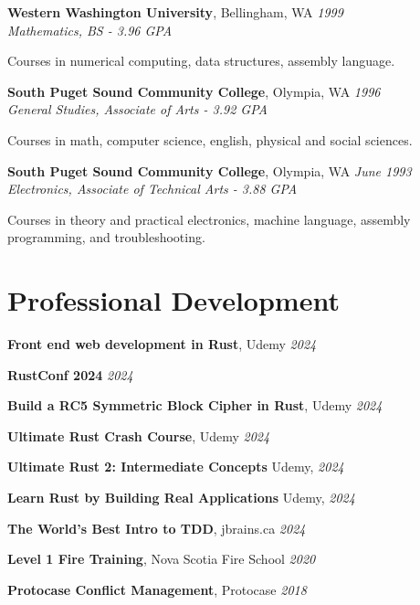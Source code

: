 \documentclass[letter,11pt]{article}
\newenvironment{noindentblock}{%
  \begin{list}{}{%
    \setlength{\leftmargin}{0in} %
    \setlength{\rightmargin}{.25in} %
    \setlength{\topsep}{0pt} %
    \setlength{\parsep}{0pt} %
  }
  \item[]}{\end{list}}
\begin{document}
\noindent
\textbf{Western Washington University}, Bellingham, WA \hfill \textit{1999}\\
\textit{Mathematics, BS - 3.96 GPA}
\begin{noindentblock}
Courses in numerical computing, data structures, assembly language.
\end{noindentblock}

\noindent
\textbf{South Puget Sound Community College}, Olympia, WA \hfill \textit{1996}\\
\textit{General Studies, Associate of Arts - 3.92 GPA}
\begin{noindentblock}
Courses in math, computer science, english, physical and social sciences.
\end{noindentblock}

\noindent
\textbf{South Puget Sound Community College}, Olympia, WA \hfill \textit{June 1993}\\
\textit{Electronics, Associate of Technical Arts - 3.88 GPA}
\begin{noindentblock}
Courses in theory and practical electronics, machine language, assembly programming, and troubleshooting.
\end{noindentblock}

\section*{Professional Development}
\noindent
\textbf{Front end web development in Rust}, Udemy \hfill \textit{2024}

\noindent
\textbf{RustConf 2024} \hfill \textit{2024}

\noindent
\textbf{Build a RC5 Symmetric Block Cipher in Rust}, Udemy \hfill \textit{2024}

\noindent
\textbf{Ultimate Rust Crash Course}, Udemy \hfill \textit{2024}

\noindent
\textbf{Ultimate Rust 2: Intermediate Concepts} Udemy, \hfill \textit{2024}

\noindent
\textbf{Learn Rust by Building Real Applications} Udemy, \hfill \textit{2024}

\noindent
\textbf{The World's Best Intro to TDD}, jbrains.ca \hfill \textit{2024}

\noindent
\textbf{Level 1 Fire Training}, Nova Scotia Fire School \hfill \textit{2020}

\noindent
\textbf{Protocase Conflict Management}, Protocase \hfill \textit{2018}
\end{document}
